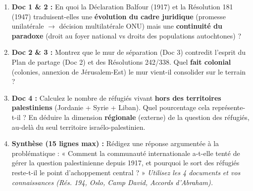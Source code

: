 \documentclass[11pt]{article}
\begin{document}
\begin{exercice}
\begin{enumerate}
    \item \textbf{Doc 1 \& 2 :} En quoi la Déclaration Balfour (1917) et la Résolution 181 (1947) traduisent-elles une \textbf{évolution du cadre juridique} (promesse unilatérale $\rightarrow$ décision multilatérale ONU) mais une \textbf{continuité du paradoxe} (droit au foyer national vs droits des populations autochtones) ?
    \item \textbf{Doc 2 \& 3 :} Montrez que le mur de séparation (Doc 3) contredit l'esprit du Plan de partage (Doc 2) et des Résolutions 242/338. Quel \textbf{fait colonial} (colonies, annexion de Jérusalem-Est) le mur vient-il consolider sur le terrain ?
    \item \textbf{Doc 4 :} Calculez le nombre de réfugiés vivant \textbf{hors des territoires palestiniens} (Jordanie + Syrie + Liban). Quel pourcentage cela représente-t-il ? En déduire la dimension \textbf{régionale} (externe) de la question des réfugiés, au-delà du seul territoire israélo-palestinien.
    \item \textbf{Synthèse (15 lignes max) :} Rédigez une réponse argumentée à la problématique : « Comment la communauté internationale a-t-elle tenté de gérer la question palestinienne depuis 1917, et pourquoi le sort des réfugiés reste-t-il le point d'achoppement central ? » \textit{Utilisez les 4 documents et vos connaissances (Rés. 194, Oslo, Camp David, Accords d'Abraham).}
\end{enumerate}
\end{exercice}
\end{document}
